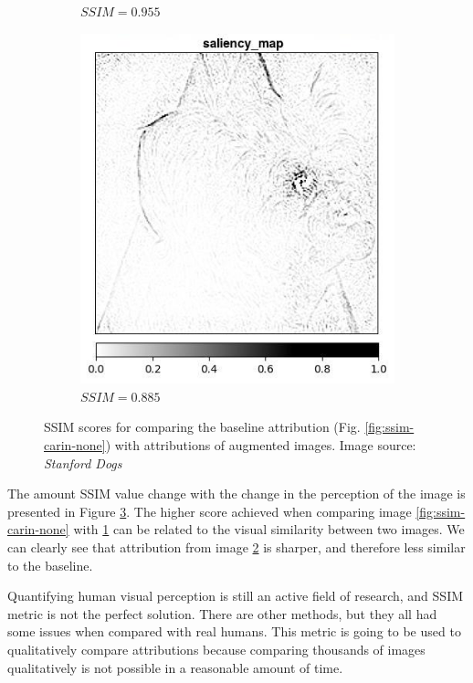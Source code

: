 \begin{figure}[h]
\begin{subfigure}{.3\textwidth}
    \caption{$SSIM = 0.955$}\label{fig:ssim-carin-sharp}
\end{subfigure}
 \begin{subfigure}{.3\textwidth}
    \centering
    \includegraphics[width=\textwidth]{methods/images/cairn-norm.jpg}
    \caption{$SSIM = 0.885$}\label{fig:ssim-carin-norm}
\end{subfigure}

 \caption{SSIM scores for comparing the baseline attribution (Fig. \ref{fig:ssim-carin-none}) with attributions of augmented images. Image source: \textit{Stanford Dogs} \cite{stanford-dogs} }\label{fig:ssim-scores-example}
\end{figure}

The amount SSIM value change with the change in the perception of the image is presented in Figure \ref{fig:ssim-scores-example}. The higher score achieved when comparing image \ref{fig:ssim-carin-none} with \ref{fig:ssim-carin-sharp} can be related to the visual similarity between two images. We can clearly see that attribution from image \ref{fig:ssim-carin-norm} is sharper, and therefore less similar to the baseline.

\begin{remark}
Quantifying human visual perception is still an active field of research, and SSIM metric is not the perfect solution. There are other methods, but they all had some issues when compared with real humans. This metric is going to be used to qualitatively compare attributions because comparing thousands of images qualitatively is not possible in a reasonable amount of time.
\end{remark}